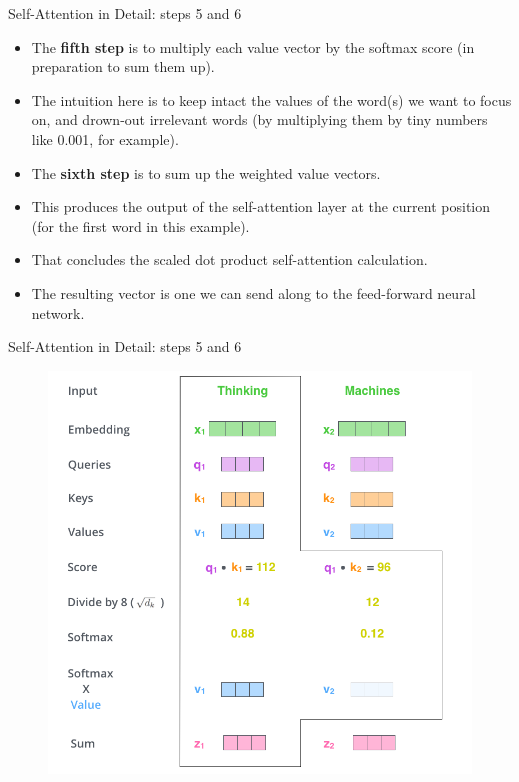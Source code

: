 \documentclass[handout]{beamer}
\begin{document}
\begin{frame}{Self-Attention in Detail: steps 5 and 6}
\begin{scriptsize}
\begin{itemize}


\item The \textbf{fifth step} is to multiply each value vector by the softmax score (in preparation to sum them up).

\item The intuition here is to keep intact the values of the word(s) we want to focus on, and drown-out irrelevant words (by multiplying them by tiny numbers like 0.001, for example).

\item The \textbf{sixth step} is to sum up the weighted value vectors.

\item This produces the output of the self-attention layer at the current position (for the first word in this example).

\item That concludes the scaled dot product self-attention calculation.

\item The resulting vector is one we can send along to the feed-forward neural network.


\end{itemize}

\end{scriptsize}


\end{frame}

\begin{frame}{Self-Attention in Detail: steps 5 and 6}


\begin{figure}[h]
        	\includegraphics[scale = 0.3]{pics/self-attention-output.png}
        \end{figure} 


\end{frame}
\end{document}

